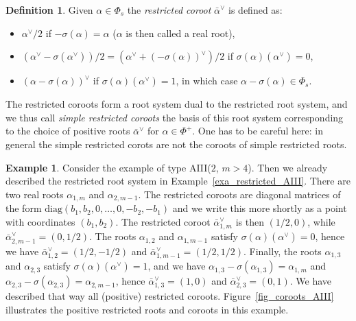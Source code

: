 \documentclass{amsart}
\theoremstyle{definition}
\newtheorem{defn}[thm]{Definition}
\newtheorem{exa}[thm]{Example}
\begin{document}
\begin{defn}
\label{defn_rcoroot}
Given $\alpha\in \Phi_s$ the \emph{restricted coroot} $\bar{\alpha}^{\vee}$ 
is defined as:
\begin{itemize}
\item $\alpha^{\vee}/2$ if $-\sigma(\alpha)=\alpha$ ($\alpha$ is then called a real root), 
\item $(\alpha^{\vee}-\sigma(\alpha^{\vee}))/2=(\alpha^{\vee}+(-\sigma(\alpha))^{\vee})/2$ if $\sigma(\alpha)(\alpha^{\vee})=0$,
\item $(\alpha-\sigma(\alpha))^{\vee}$ if $\sigma(\alpha)(\alpha^{\vee})=1$, in which 
case $\alpha-\sigma(\alpha)\in \Phi_s$. 
\end{itemize}
\end{defn}

The restricted coroots form a root system dual to the restricted root system, 
and we thus call \emph{simple restricted coroots} the basis of this root system 
corresponding to the choice of positive roots $\bar{\alpha}^{\vee}$ 
for $\alpha\in \Phi^+$. 
One has to be careful here: in general the simple restricted corots are not 
the coroots of simple restricted roots. 

\begin{exa}
\label{exa_coroots_AIII}
Consider the example of type AIII($2$, $m>4$). 
Then we already described the restricted root system in 
Example~\ref{exa_restricted_AIII}. 
There are two real roots $\alpha_{1,m}$ and $\alpha_{2,m-1}$. 
The restricted coroots are diagonal matrices of the form 
$\mathrm{diag}(b_1,b_2,0,\ldots,0,-b_2,-b_1)$ and we write 
this more shortly as a point with coordinates $(b_1,b_2)$.
The restricted coroot $\bar{\alpha}_{1,m}^{\vee}$ is then 
$(1/2,0)$, while 
$\bar{\alpha}_{2,m-1}^{\vee}=(0,1/2)$.
The roots $\alpha_{1,2}$ and $\alpha_{1,m-1}$ satisfy $\sigma(\alpha)(\alpha^{\vee})=0$,
hence we have $\bar{\alpha}_{1,2}^{\vee}=(1/2,-1/2)$ 
and $\bar{\alpha}_{1,m-1}^{\vee}=(1/2,1/2)$.
Finally, the roots $\alpha_{1,3}$ and $\alpha_{2,3}$ satisfy 
$\sigma(\alpha)(\alpha^{\vee})=1$, and we have 
$\alpha_{1,3}-\sigma(\alpha_{1,3})=\alpha_{1,m}$ 
and $\alpha_{2,3}-\sigma(\alpha_{2,3})=\alpha_{2,m-1}$, hence 
$\bar{\alpha}_{1,3}^{\vee}=(1,0)$ and 
$\bar{\alpha}_{2,3}^{\vee}=(0,1)$.
We have described that way all (positive) restricted coroots.
Figure~\ref{fig_coroots_AIII} illustrates the positive restricted 
roots and coroots in this example. 
\end{exa}
\end{document}
